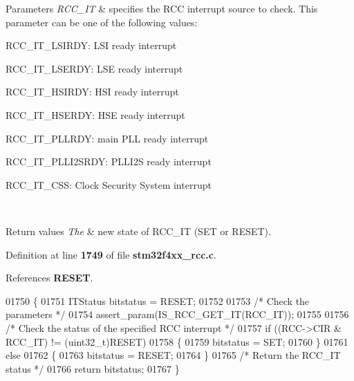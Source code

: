\begin{DoxyParams}{Parameters}
{\em R\+C\+C\+\_\+\+IT} & specifies the R\+CC interrupt source to check. This parameter can be one of the following values\+: \begin{DoxyItemize}
\item R\+C\+C\+\_\+\+I\+T\+\_\+\+L\+S\+I\+R\+DY\+: L\+SI ready interrupt \item R\+C\+C\+\_\+\+I\+T\+\_\+\+L\+S\+E\+R\+DY\+: L\+SE ready interrupt \item R\+C\+C\+\_\+\+I\+T\+\_\+\+H\+S\+I\+R\+DY\+: H\+SI ready interrupt \item R\+C\+C\+\_\+\+I\+T\+\_\+\+H\+S\+E\+R\+DY\+: H\+SE ready interrupt \item R\+C\+C\+\_\+\+I\+T\+\_\+\+P\+L\+L\+R\+DY\+: main P\+LL ready interrupt \item R\+C\+C\+\_\+\+I\+T\+\_\+\+P\+L\+L\+I2\+S\+R\+DY\+: P\+L\+L\+I2S ready interrupt \item R\+C\+C\+\_\+\+I\+T\+\_\+\+C\+SS\+: Clock Security System interrupt \end{DoxyItemize}
\\
\hline
\end{DoxyParams}

\begin{DoxyRetVals}{Return values}
{\em The} & new state of R\+C\+C\+\_\+\+IT (S\+ET or R\+E\+S\+ET). \\
\hline
\end{DoxyRetVals}


Definition at line \textbf{ 1749} of file \textbf{ stm32f4xx\+\_\+rcc.\+c}.



References \textbf{ R\+E\+S\+ET}.


\begin{DoxyCode}
01750 \{
01751   ITStatus bitstatus = RESET;
01752 
01753   \textcolor{comment}{/* Check the parameters */}
01754   assert_param(IS_RCC_GET_IT(RCC\_IT));
01755 
01756   \textcolor{comment}{/* Check the status of the specified RCC interrupt */}
01757   \textcolor{keywordflow}{if} ((RCC->CIR & RCC\_IT) != (uint32\_t)RESET)
01758   \{
01759     bitstatus = SET;
01760   \}
01761   \textcolor{keywordflow}{else}
01762   \{
01763     bitstatus = RESET;
01764   \}
01765   \textcolor{comment}{/* Return the RCC\_IT status */}
01766   \textcolor{keywordflow}{return}  bitstatus;
01767 \}
\end{DoxyCode}
\mbox{\label{group__RCC__Group4_gaa953aa226e9ce45300d535941e4dfe2f}} 

